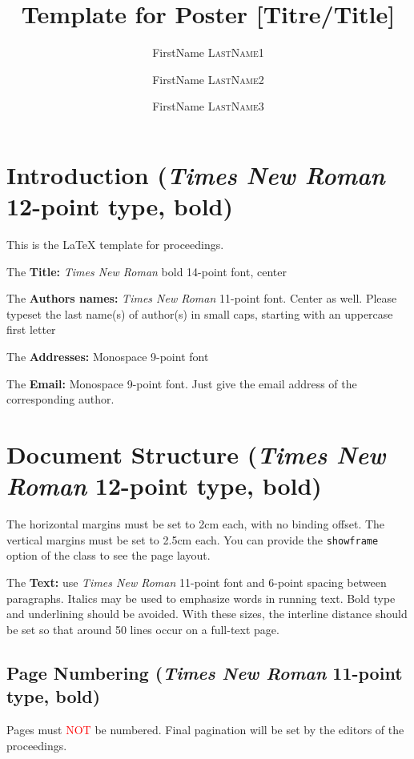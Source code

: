 \documentclass[poster, final]{jobim2017}
\title{Template for \jobim2017 Poster [Titre/Title]}
\author{FirstName \textsc{LastName1}\inst{1} \and FirstName \textsc{LastName2}\inst{2} \and FirstName \textsc{LastName3}\inst{2}}
\institute{
 Laboratory, Address, zip code, Town, Country
 \and
 Laboratory, Address, zip code, Town, Country 
}
\begin{document}

   \maketitle

 \section{Introduction (\emph{Times New Roman} 12-point type, bold)}
 \label{sec:introduction}

This is the {\LaTeX} template for  proceedings.

The \textbf{Title:} \emph{Times New Roman} bold 14-point font, center

The \textbf{Authors names:} \emph{Times New Roman} 11-point font. Center as
well. Please typeset the last name(s) of author(s) in small caps, starting
with an uppercase first letter

The \textbf{Addresses:} Monospace 9-point font

The \textbf{Email:} Monospace 9-point font. Just give the email address of the corresponding author.

\section{Document Structure (\emph{Times New Roman} 12-point type, bold)}
\label{sec:doc-struct}

The horizontal margins must be set to 2cm each, with no binding offset. The
vertical margins must be set to 2.5cm each. You can provide the
\verb+showframe+ option of the \LaTeXe\space class to see the page layout.

The \textbf{Text:} use \emph{Times New Roman} 11-point font and 6-point spacing between paragraphs.
Italics may be used to emphasize words in running text. Bold type and underlining should be avoided.
With these sizes, the interline distance should be set so that around 50 lines occur on a full-text
page.


\subsection{Page Numbering (\emph{Times New Roman} 11-point type, bold)}
\label{sec:page-numbering}

Pages must \textcolor{red}{NOT} be numbered. Final pagination will be set by
the editors of the proceedings.
\end{document}
